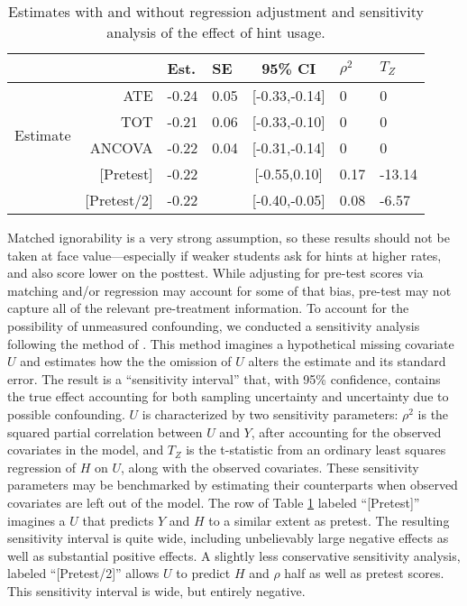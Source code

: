 \documentclass{article}
\begin{document}
\begin{table}
\centering
\begin{tabular}{crllcll}
&&Est.&SE&95\% CI&$\rho^2$&$T_Z$\\
\hline
\multirow{4}{*}{Estimate}%
&ATE&-0.24&0.05&[-0.33,-0.14]&0&0\\
&TOT&-0.21&0.06&[-0.33,-0.10]&0&0\\
&ANCOVA&-0.22&0.04&[-0.31,-0.14]&0&0\\
\hline
\multirow{2}{*}{Sensitivity}&[Pretest]&-0.22&&[-0.55,0.10]&0.17&-13.14\\
&[Pretest/2]&-0.22&&[-0.40,-0.05]&0.08&-6.57\\
\hline
\end{tabular}
\caption{Estimates with and without regression adjustment and
  sensitivity analysis of the effect of hint usage.}
\label{tab:matchResults}
\end{table}

Matched ignorability is a very strong assumption, so these results
should not be taken at face value---especially if weaker students ask for hints at
higher rates, and also score lower on the posttest.
While adjusting for pre-test scores via matching and/or regression
may account for some of that bias, pre-test may not capture all of the
relevant pre-treatment information.
To account for the possibility of unmeasured confounding, we conducted
a sensitivity analysis following the method of \citet{hhh}.
This method imagines a hypothetical missing covariate $U$ and estimates
how the the omission of $U$ alters the estimate
and its standard error.
The result is a ``sensitivity interval'' \citep[c.f.][]{rosenbaum2002observational} that,
with 95\% confidence, contains the true effect accounting for both
sampling uncertainty and uncertainty due to possible confounding.
$U$ is characterized by two sensitivity parameters:
$\rho^2$ is the squared partial correlation between $U$ and $Y$, after
accounting for the observed covariates in the model, and $T_Z$ is the
t-statistic from an ordinary least squares regression of $H$ on $U$, along with the observed covariates.
These sensitivity parameters may be benchmarked by estimating their
counterparts when observed covariates are left out of the model.
The row of Table \ref{tab:matchResults} labeled ``[Pretest]''
imagines a $U$ that predicts $Y$ and $H$ to a similar extent as
pretest.
The resulting sensitivity interval is quite wide, including
unbelievably large negative effects as well as substantial positive
effects.
A slightly less conservative sensitivity analysis, labeled
``[Pretest/2]'' allows $U$ to
predict $H$ and $\rho$ half as well as pretest scores.
This sensitivity interval is wide, but entirely negative.
\end{document}
